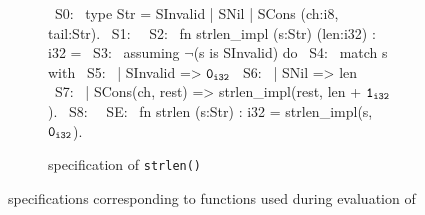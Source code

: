 \begin{figure}[H]
\begin{subfigure}[b]{\textwidth}
\begin{center}
\begin{allLangEnvFoot}
~{\tiny \textcolor{mygray}{S0:}}~ type Str = SInvalid | SNil | SCons (ch:i8, tail:Str).
~{\tiny \textcolor{mygray}{S1:}}~ 
~{\tiny \textcolor{mygray}{S2:}}~ fn strlen_impl (s:Str) (len:i32) : i32 =
~{\tiny \textcolor{mygray}{S3:}}~   assuming $\neg$(s is SInvalid) do
~{\tiny \textcolor{mygray}{S4:}}~   match s with
~{\tiny \textcolor{mygray}{S5:}}~   | SInvalid => ${\tt 0_{i32}}$
~{\tiny \textcolor{mygray}{S6:}}~   | SNil => len
~{\tiny \textcolor{mygray}{S7:}}~   | SCons(ch, rest) => strlen_impl(rest, len + ${\tt 1_{i32}}$).
~{\tiny \textcolor{mygray}{S8:}}~ 
~{\tiny \textcolor{mygray}{SE:}}~ fn strlen (s:Str) : i32 = strlen_impl(s, ${\tt 0_{i32}}$).
\end{allLangEnvFoot}
\end{center}
\caption{\SpecL{} specification of {\tt strlen()}}
\end{subfigure}
\caption{\label{fig:specifications}\SpecL{} specifications corresponding to functions used during evaluation of \toolName{}}
\end{figure}
